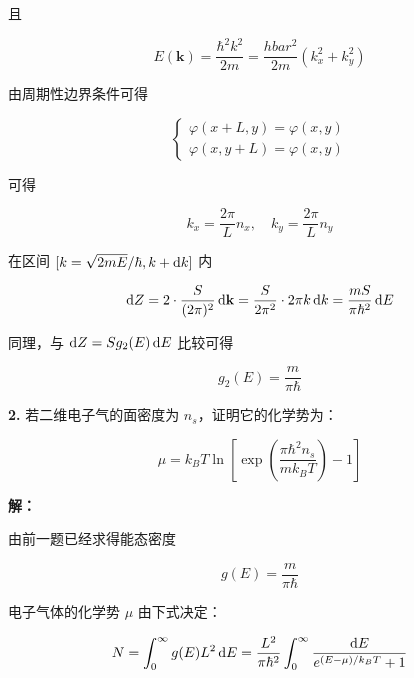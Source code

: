 且

\begin{equation*}
    E(\mathbf{k}) = \frac{\hbar^2 k^2}{2m} = \frac{hbar^2}{2m} (k_x^2 + k_y^2)
\end{equation*}

由周期性边界条件可得

\begin{equation*}
    \begin{cases}
        \varphi(x+L, y) = \varphi(x, y) \\
        \varphi(x, y+L) = \varphi(x, y)
    \end{cases}
\end{equation*}

可得

\begin{equation*}
    k_x = \frac{2\pi}{L} n_x, \quad k_y = \frac{2\pi}{L} n_y
\end{equation*}

在区间 $[k=\sqrt{2mE}/\hbar, k+\mathop{}\!\mathrm{d} k]$ 内

\begin{equation*}
    \mathop{}\!\mathrm{d} Z = 2 \cdot \frac{S}{(2\pi)^2} \mathop{}\!\mathrm{d} \mathbf{k} = \frac{S}{2\pi^2} \cdot 2\pi k \mathop{}\!\mathrm{d} k = \frac{mS}{\pi \hbar^2} \mathop{}\!\mathrm{d} E
\end{equation*}

同理，与 $\mathop{}\!\mathrm{d} Z=S g_2(E) \mathop{}\!\mathrm{d} E$ 比较可得

\begin{equation*}
    g_2(E) = \frac{m}{\pi \hbar}
\end{equation*}

\noindent \textbf{2.\quad} 若二维电子气的面密度为 $n_s$，证明它的化学势为：

\begin{equation*}
    \mu = k_B T \ln \left[\exp\left(\frac{\pi\hbar^2 n_s}{m k_B T}\right)-1\right]
\end{equation*}

\noindent \textbf{解：}

由前一题已经求得能态密度

\begin{equation*}
    g(E) = \frac{m}{\pi\hbar}
\end{equation*}

电子气体的化学势 $\mu$ 由下式决定：

\begin{equation*}
    N = \int_0^\infty g(E) L^2 \mathop{}\!\mathrm{d} E = \frac{L^2}{\pi \hbar^2} \int_0^\infty \frac{\mathop{}\!\mathrm{d} E}{e^{(E-\mu)/k_B T}+1}
\end{equation*}

